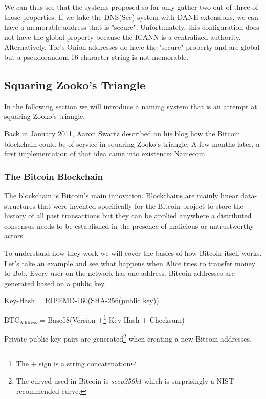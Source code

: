 \documentclass{vldb}
\begin{document}
We can thus see that the systems proposed so far only gather two out of three of those properties. If we take the DNS(Sec) system with DANE extensions, we can have a memorable address that is "secure". Unfortunately, this configuration does not have the global property because the ICANN is a centralized authority. Alternatively, Tor's Onion addresses do have the "secure" property and are global but a pseudorandom 16-character string is not memorable.

\subsection{Squaring Zooko's Triangle}

In the following section we will introduce a naming system that is an attempt at squaring Zooko's triangle.

Back in January 2011, Aaron Swartz described on his blog\cite{aaronBlog} how the Bitcoin blockchain could be of service in squaring Zooko's triangle. A few months later, a first implementation of that idea came into existence: Namecoin.

\subsubsection{The Bitcoin Blockchain}

The blockchain is Bitcoin's main innovation. Blockchains are mainly linear data-structures that were invented specifically for the Bitcoin project to store the history of all past transactions but they can be applied anywhere a distributed consensus needs to be established in the presence of malicious or untrustworthy actors.

To understand how they work we will cover the basics of how Bitcoin itself works. Let's take an example and see what happens when Alice tries to transfer money to Bob. Every user on the network has one address. Bitcoin addresses\cite{bitcoinSpec} are generated based on a public key. 
\begin{center}

Key-Hash = RIPEMD-160(SHA-256(public key))

$\text{BTC}_{\text{Address}}$ = Base58(Version +\footnote{The + sign is a string concatenation} Key-Hash + Checksum)
\end{center}

Private-public key pairs are generated\footnote{The curved used in Bitcoin is \emph{secp256k1} which is surprisingly a NIST recommended curve.} when creating a new Bitcoin addresses.
\end{document}
